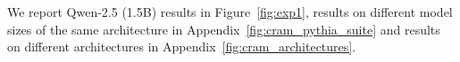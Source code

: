 


We report Qwen-2.5 (1.5B) results in Figure~\ref{fig:exp1}, results on different model sizes of the same architecture in Appendix~\ref{fig:cram_pythia_suite} and results on different architectures in Appendix~\ref{fig:cram_architectures}.

